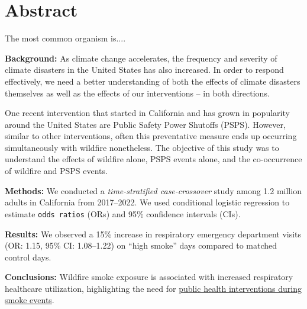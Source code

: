 \documentclass[../main.tex]{subfiles}
\begin{document}
\section{Abstract}

The most common organism is....  \commonOrgEXAMPLE

\textbf{Background:} As climate change accelerates, the frequency and severity of climate disasters in the United States has also increased. In order to respond effectively, we need a better understanding of both the effects of climate disasters themselves as well as the effects of our interventions -- in both directions. 

One recent intervention that started in California and has grown in popularity around the United States are Public Safety Power Shutoffs (PSPS). However, similar to other interventions, often this preventative measure ends up occurring simultaneously with wildfire \PM nonetheless. The objective of this study was to understand the effects of wildfire \PM alone, PSPS events alone, and the co-occurrence of wildfire \PM and PSPS events.

\textbf{Methods:} We conducted a \textit{time-stratified case-crossover} study among 1.2 million adults in California from 2017--2022. We used conditional logistic regression to estimate \texttt{odds ratios} (ORs) and 95\% confidence intervals (CIs).

\textbf{Results:} We observed a 15\% increase in respiratory emergency department visits (OR: 1.15, 95\% CI: 1.08--1.22) on ``high smoke'' days compared to matched control days.

\textbf{Conclusions:} Wildfire smoke exposure is associated with increased respiratory healthcare utilization, highlighting the need for \underline{public health interventions during smoke events}.


\clearpage
\end{document}

